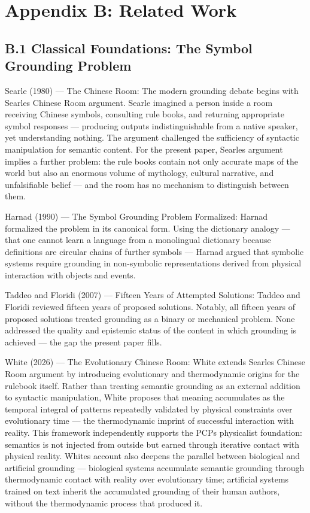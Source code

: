 \documentclass[
]{article}
\begin{document}
\section{\texorpdfstring{\textbf{Appendix B: Related
Work}}{Appendix B: Related Work}}\label{appendix-b-related-work}

\subsection{B.1 Classical Foundations: The Symbol Grounding
Problem}\label{b.1-classical-foundations-the-symbol-grounding-problem}

Searle (1980) --- The Chinese Room: The modern grounding debate begins
with Searle\textquotesingle s Chinese Room argument. Searle imagined a
person inside a room receiving Chinese symbols, consulting rule books,
and returning appropriate symbol responses --- producing outputs
indistinguishable from a native speaker, yet understanding nothing. The
argument challenged the sufficiency of syntactic manipulation for
semantic content. For the present paper, Searle\textquotesingle s
argument implies a further problem: the rule books contain not only
accurate maps of the world but also an enormous volume of mythology,
cultural narrative, and unfalsifiable belief --- and the room has no
mechanism to distinguish between them.

Harnad (1990) --- The Symbol Grounding Problem Formalized: Harnad
formalized the problem in its canonical form. Using the dictionary
analogy --- that one cannot learn a language from a monolingual
dictionary because definitions are circular chains of further symbols
--- Harnad argued that symbolic systems require grounding in
non-symbolic representations derived from physical interaction with
objects and events.

Taddeo and Floridi (2007) --- Fifteen Years of Attempted Solutions:
Taddeo and Floridi reviewed fifteen years of proposed solutions.
Notably, all fifteen years of proposed solutions treated grounding as a
binary or mechanical problem. None addressed the quality and epistemic
status of the content in which grounding is achieved --- the gap the
present paper fills.

White (2026) --- The Evolutionary Chinese Room: White extends
Searle\textquotesingle s Chinese Room argument by introducing
evolutionary and thermodynamic origins for the rulebook itself. Rather
than treating semantic grounding as an external addition to syntactic
manipulation, White proposes that meaning accumulates as the temporal
integral of patterns repeatedly validated by physical constraints over
evolutionary time --- the thermodynamic imprint of successful
interaction with reality. This framework independently supports the
PCP\textquotesingle s physicalist foundation: semantics is not injected
from outside but earned through iterative contact with physical reality.
White\textquotesingle s account also deepens the parallel between
biological and artificial grounding --- biological systems accumulate
semantic grounding through thermodynamic contact with reality over
evolutionary time; artificial systems trained on text inherit the
accumulated grounding of their human authors, without the thermodynamic
process that produced it.
\end{document}
